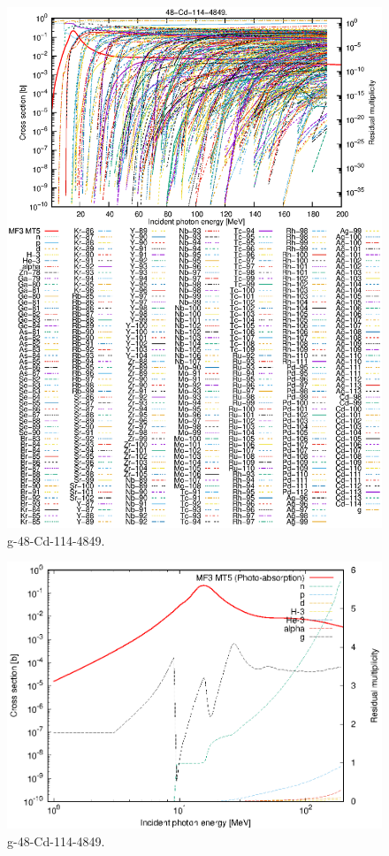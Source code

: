 \begin{figure}
 \includegraphics[width=\linewidth]{eps/g_48-Cd-114_4849.eps}
  \caption{g-48-Cd-114-4849.}
\end{figure}
\newpage \clearpage

\begin{figure}
 \includegraphics[width=\linewidth]{eps-log/g_48-Cd-114_4849.eps}
 \caption{g-48-Cd-114-4849.}
\end{figure}
\newpage \clearpage

